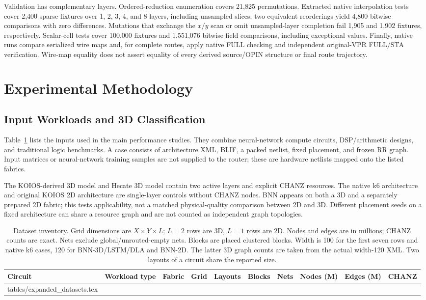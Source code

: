 \documentclass[conference,10pt,letterpaper]{IEEEtran}
\makeatletter
\newcommand{\tableinput}[1]{\@@input #1 }
\makeatother
\begin{document}
Validation has complementary layers. Ordered-reduction enumeration covers 21,825 permutations. Extracted native interpolation tests cover 2,400 sparse fixtures over 1, 2, 3, 4, and 8 layers, including unsampled slices; two equivalent reorderings yield 4,800 bitwise comparisons with zero differences. Mutations that exchange the $x/y$ scan or omit unsampled-layer completion fail 1,905 and 1,902 fixtures, respectively. Scalar-cell tests cover 100,000 fixtures and 1,551,076 bitwise field comparisons, including exceptional values. Finally, native runs compare serialized wire maps and, for complete routes, apply native FULL checking and independent original-VPR FULL/STA verification. Wire-map equality does not assert equality of every derived source/OPIN structure or final route trajectory.

\section{Experimental Methodology}
\subsection{Input Workloads and 3D Classification}
Table~\ref{tab:datasets} lists the inputs used in the main performance studies. They combine neural-network compute circuits, DSP/arithmetic designs, and traditional logic benchmarks. A case consists of architecture XML, BLIF, a packed netlist, fixed placement, and frozen RR graph. Input matrices or neural-network training samples are not supplied to the router; these are hardware netlists mapped onto the listed fabrics.

The KOIOS-derived 3D model and Hecate 3D model contain two active layers and explicit CHANZ resources. The native k6 architecture and original KOIOS 2D architecture are single-layer controls without CHANZ nodes. BNN appears on both a 3D and a separately prepared 2D fabric; this tests applicability, not a matched physical-quality comparison between 2D and 3D. Different placement seeds on a fixed architecture can share a resource graph and are not counted as independent graph topologies.

\begin{table}[t]
\centering\scriptsize
\caption{Dataset inventory. Grid dimensions are $X\times Y\times L$; $L=2$ rows are 3D, $L=1$ rows are 2D. Nodes and edges are in millions; CHANZ counts are exact. Nets exclude global/unrouted-empty nets. Blocks are placed clustered blocks. Width is 100 for the first seven rows and native k6 cases, 120 for BNN-3D/LSTM/DLA and BNN-2D. The latter 3D graph counts are taken from the actual width-120 XML. Two layouts of a circuit share the reported size.}
\label{tab:datasets}
\setlength{\tabcolsep}{3pt}
\begin{tabular}{lllrrrrrrr}
\toprule
Circuit & Workload type & Fabric & Grid & Layouts & Blocks & Nets & Nodes (M) & Edges (M) & CHANZ \\
\midrule
\tableinput{tables/expanded_datasets.tex}
\bottomrule
\end{tabular}
\end{table}
\end{document}
